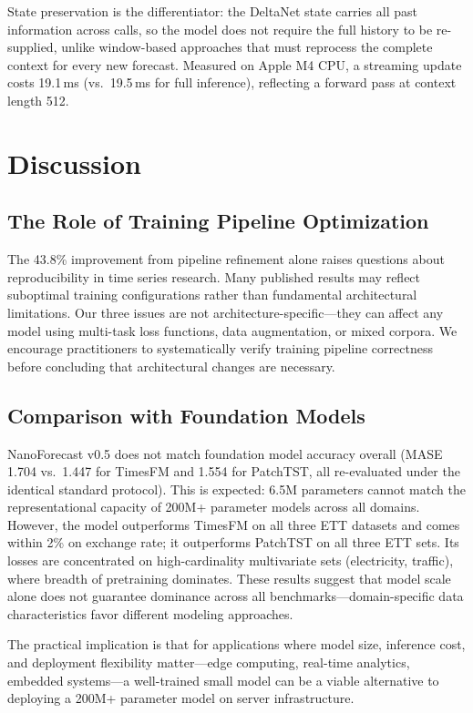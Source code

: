\documentclass[11pt]{article}
\begin{document}
State preservation is the differentiator: the DeltaNet state carries all past information across calls, so the model does not require the full history to be re-supplied, unlike window-based approaches that must reprocess the complete context for every new forecast. Measured on Apple M4 CPU, a streaming update costs 19.1\,ms (vs.\ 19.5\,ms for full inference), reflecting a forward pass at context length 512.

\section{Discussion}
\label{sec:discussion}

\subsection{The Role of Training Pipeline Optimization}
The 43.8\% improvement from pipeline refinement alone raises questions about reproducibility in time series research. Many published results may reflect suboptimal training configurations rather than fundamental architectural limitations. Our three issues are not architecture-specific---they can affect any model using multi-task loss functions, data augmentation, or mixed corpora. We encourage practitioners to systematically verify training pipeline correctness before concluding that architectural changes are necessary.

\subsection{Comparison with Foundation Models}
NanoForecast v0.5 does not match foundation model accuracy overall (MASE 1.704 vs.\ 1.447 for TimesFM and 1.554 for PatchTST, all re-evaluated under the identical standard protocol). This is expected: 6.5M parameters cannot match the representational capacity of 200M+ parameter models across all domains. However, the model outperforms TimesFM on all three ETT datasets and comes within 2\% on exchange rate; it outperforms PatchTST on all three ETT sets. Its losses are concentrated on high-cardinality multivariate sets (electricity, traffic), where breadth of pretraining dominates. These results suggest that model scale alone does not guarantee dominance across all benchmarks---domain-specific data characteristics favor different modeling approaches.

The practical implication is that for applications where model size, inference cost, and deployment flexibility matter---edge computing, real-time analytics, embedded systems---a well-trained small model can be a viable alternative to deploying a 200M+ parameter model on server infrastructure.
\end{document}
